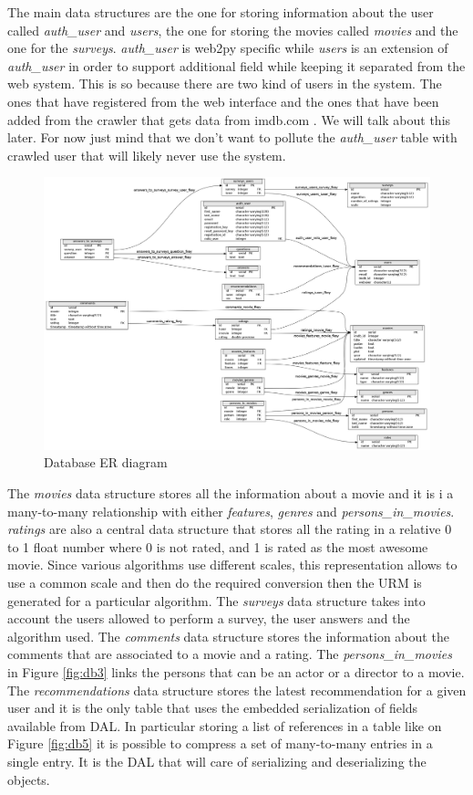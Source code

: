 The main data structures are the one for storing information about the user called \textit{auth\_user} and \textit{users}, the one for storing the movies called \textit{movies} and the one for the \textit{surveys}. \textit{auth\_user} is web2py specific while \textit{users} is an extension of \textit{auth\_user} in order to support additional field while keeping it separated from the web system. This is so because there are two kind of users in the system. The ones that have registered from the web interface and the ones that have been added from the crawler that gets data from imdb.com \cite{imdb}. We will talk about this later. For now just mind that we don't want to pollute the \textit{auth\_user} table with crawled user that will likely never use the system.

\begin{figure}
  \centering
  \includegraphics[height=0.7\textheight, angle=90]{figures/db_er.png}
  \caption{Database ER diagram}
  \label{fig:db_er}
\end{figure}

The \textit{movies} data structure stores all the information about a movie and it is i a many-to-many relationship with either \textit{features}, \textit{genres} and \textit{persons\_in\_movies}. \textit{ratings} are also a central data structure that stores all the rating in a relative 0 to 1 float number where 0 is not rated, and 1 is rated as the most awesome movie. Since various algorithms use different scales, this representation allows to use a common scale and then do the required conversion then the \ac{URM} is generated for a particular algorithm.
The \textit{surveys} data structure takes into account the users allowed to perform a survey, the user answers and the algorithm used. The \textit{comments} data structure stores the information about the comments that are associated to a movie and a rating. The \textit{persons\_in\_movies} in Figure \ref{fig:db3} links the persons that can be an actor or a director to a movie. The \textit{recommendations} data structure stores the latest recommendation for a given user and it is the only table that uses the embedded serialization of fields available from \ac{DAL}. In particular storing a list of references in a table like on Figure \ref{fig:db5} it is possible to compress a set of many-to-many entries in a single entry. It is the \ac{DAL} that will care of serializing and deserializing the objects.   
 
